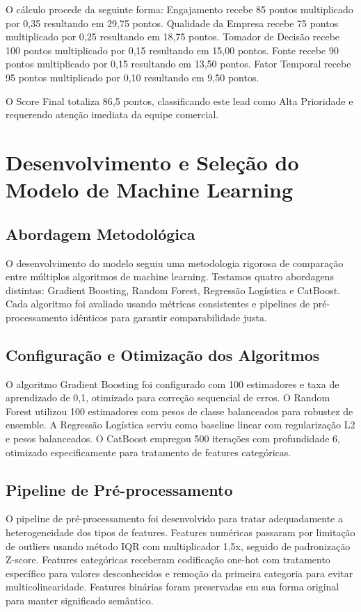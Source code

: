 \documentclass[portuguese,11pt]{article}
\begin{document}
O cálculo procede da seguinte forma: Engajamento recebe 85 pontos multiplicado por 0,35 resultando em 29,75 pontos. Qualidade da Empresa recebe 75 pontos multiplicado por 0,25 resultando em 18,75 pontos. Tomador de Decisão recebe 100 pontos multiplicado por 0,15 resultando em 15,00 pontos. Fonte recebe 90 pontos multiplicado por 0,15 resultando em 13,50 pontos. Fator Temporal recebe 95 pontos multiplicado por 0,10 resultando em 9,50 pontos.

O Score Final totaliza 86,5 pontos, classificando este lead como Alta Prioridade e requerendo atenção imediata da equipe comercial.

\section{Desenvolvimento e Seleção do Modelo de Machine Learning}

\subsection{Abordagem Metodológica}
O desenvolvimento do modelo seguiu uma metodologia rigorosa de comparação entre múltiplos algoritmos de machine learning. Testamos quatro abordagens distintas: Gradient Boosting, Random Forest, Regressão Logística e CatBoost. Cada algoritmo foi avaliado usando métricas consistentes e pipelines de pré-processamento idênticos para garantir comparabilidade justa.

\subsection{Configuração e Otimização dos Algoritmos}
O algoritmo Gradient Boosting foi configurado com 100 estimadores e taxa de aprendizado de 0,1, otimizado para correção sequencial de erros. O Random Forest utilizou 100 estimadores com pesos de classe balanceados para robustez de ensemble. A Regressão Logística serviu como baseline linear com regularização L2 e pesos balanceados. O CatBoost empregou 500 iterações com profundidade 6, otimizado especificamente para tratamento de features categóricas.

\subsection{Pipeline de Pré-processamento}
O pipeline de pré-processamento foi desenvolvido para tratar adequadamente a heterogeneidade dos tipos de features. Features numéricas passaram por limitação de outliers usando método IQR com multiplicador 1,5x, seguido de padronização Z-score. Features categóricas receberam codificação one-hot com tratamento específico para valores desconhecidos e remoção da primeira categoria para evitar multicolinearidade. Features binárias foram preservadas em sua forma original para manter significado semântico.
\end{document}
